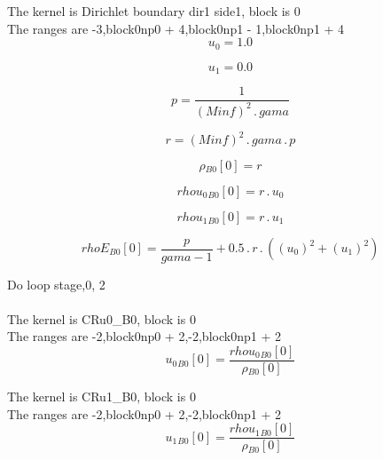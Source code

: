 \documentclass{article}
\begin{document}
\noindent The kernel is Dirichlet boundary dir1 side1, block is 0\\\noindent The ranges are -3,block0np0 + 4,block0np1 - 1,block0np1 + 4\\\begin{dmath}u_{0} = 1.0\end{dmath}

\begin{dmath}u_{1} = 0.0\end{dmath}

\begin{dmath}p = \frac{1}{\left(Minf \right)^{2} \,.\, gama}\end{dmath}

\begin{dmath}r = \left(Minf \right)^{2} \,.\, gama \,.\, p\end{dmath}

\begin{dmath}{\rho{_{B0}}}[{0}] = r\end{dmath}

\begin{dmath}{rhou_{0}{_{B0}}}[{0}] = r \,.\, u_{0}\end{dmath}

\begin{dmath}{rhou_{1}{_{B0}}}[{0}] = r \,.\, u_{1}\end{dmath}

\begin{dmath}{rhoE{_{B0}}}[{0}] = \frac{p}{gama - 1} + 0.5 \,.\, r \,.\, \left(\left(u_{0} \right)^{2} + \left(u_{1} \right)^{2}\right)\end{dmath}

\noindent Do loop stage,0, 2\\
\\\noindent The kernel is CRu0_B0, block is 0\\\noindent The ranges are -2,block0np0 + 2,-2,block0np1 + 2\\\begin{dmath}{u_{0}{_{B0}}}[{0}] = \frac{{rhou_{0}{_{B0}}}[{0}]}{{\rho{_{B0}}}[{0}]}\end{dmath}

\noindent The kernel is CRu1_B0, block is 0\\\noindent The ranges are -2,block0np0 + 2,-2,block0np1 + 2\\\begin{dmath}{u_{1}{_{B0}}}[{0}] = \frac{{rhou_{1}{_{B0}}}[{0}]}{{\rho{_{B0}}}[{0}]}\end{dmath}
\end{document}
